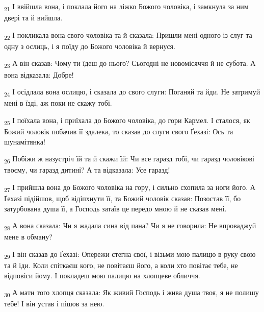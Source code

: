 \begin{tcolorbox}
\textsubscript{21} І ввійшла вона, і поклала його на ліжко Божого чоловіка, і замкнула за ним двері та й вийшла.
\end{tcolorbox}
\begin{tcolorbox}
\textsubscript{22} І покликала вона свого чоловіка та й сказала: Пришли мені одного із слуг та одну з ослиць, і я поїду до Божого чоловіка й вернуся.
\end{tcolorbox}
\begin{tcolorbox}
\textsubscript{23} А він сказав: Чому ти їдеш до нього? Сьогодні не новомісяччя й не субота. А вона відказала: Добре!
\end{tcolorbox}
\begin{tcolorbox}
\textsubscript{24} І осідлала вона ослицю, і сказала до свого слуги: Поганяй та йди. Не затримуй мені в їзді, аж поки не скажу тобі.
\end{tcolorbox}
\begin{tcolorbox}
\textsubscript{25} І поїхала вона, і приїхала до Божого чоловіка, до гори Кармел. І сталося, як Божий чоловік побачив її здалека, то сказав до слуги свого Ґехазі: Ось та шунамітянка!
\end{tcolorbox}
\begin{tcolorbox}
\textsubscript{26} Побіжи ж назустріч їй та й скажи їй: Чи все гаразд тобі, чи гаразд чоловікові твоєму, чи гаразд дитині? А та відказала: Усе гаразд!
\end{tcolorbox}
\begin{tcolorbox}
\textsubscript{27} І прийшла вона до Божого чоловіка на гору, і сильно схопила за ноги його. А Ґехазі підійшов, щоб відіпхнути її, та Божий чоловік сказав: Позостав її, бо затурбована душа її, а Господь затаїв це передо мною й не сказав мені.
\end{tcolorbox}
\begin{tcolorbox}
\textsubscript{28} А вона сказала: Чи я жадала сина від пана? Чи я не говорила: Не впроваджуй мене в обману?
\end{tcolorbox}
\begin{tcolorbox}
\textsubscript{29} І він сказав до Ґехазі: Опережи стегна свої, і візьми мою палицю в руку свою та й іди. Коли спіткаєш кого, не повітаєш його, а коли хто повітає тебе, не відповіси йому. І покладеш мою палицю на хлопцеве обличчя.
\end{tcolorbox}
\begin{tcolorbox}
\textsubscript{30} А мати того хлопця сказала: Як живий Господь і жива душа твоя, я не полишу тебе! І він устав і пішов за нею.
\end{tcolorbox}
